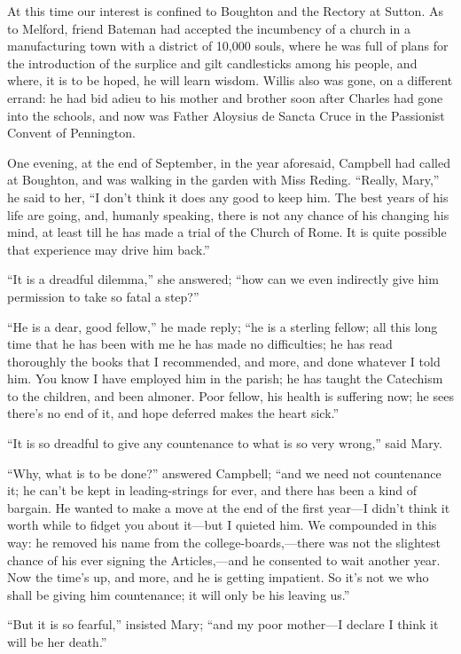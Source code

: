 At this time our interest is confined to Boughton and the Rectory
at Sutton. As to Melford, friend Bateman had accepted the incumbency
of a church in a manufacturing town with a district of 10,000 souls,
where he was full of plans for the introduction of the surplice and
gilt candlesticks among his people, and where, it is to be hoped, he
will learn wisdom. Willis also was gone, on a different errand: he had
bid adieu to his mother and brother soon after Charles had gone into
the schools, and now was Father Aloysius de Sancta Cruce in the
Passionist Convent of Pennington.

One evening, at the end of September, in the year aforesaid,
Campbell had called at Boughton, and was walking in the garden with
Miss Reding. ``Really, Mary,'' he said to her, ``I don't
think it does any good to keep him. The best years of his life are
going, and, humanly speaking, there is not any chance of his changing
his mind, at least till he has made a trial of the Church of Rome. It
is quite possible that experience may drive him back.''

``It is a dreadful dilemma,'' she answered; ``how can
we even indirectly give him permission to take so fatal a step?''

``He is a dear, good fellow,'' he made reply; ``he is a
sterling fellow; all this long time that he has been with me he has
made no difficulties; he has read thoroughly the books that I
recommended, and more, and done whatever I told him. You know I have
employed him in the parish; he has taught the Catechism to the
children, and been almoner. Poor fellow, his health is suffering now;
he sees there's no end of it, and hope deferred makes the heart
sick.''

``It is so dreadful to give any countenance to what is so very
wrong,'' said Mary.

``Why, what is to be done?'' answered Campbell; ``and
we need not countenance it; he can't be kept in leading-strings for
ever, and there has been a kind of bargain. He wanted to make a move
at the end of the first year—I didn't think it worth while to fidget
you about it—but I quieted him. We compounded in this way: he
removed his name from the college-boards,—there was not the
slightest chance of his ever signing the Articles,—and he consented
to wait another year. Now the time's up, and more, and he is
getting impatient. So it's not we who shall be giving him countenance;
it will only be his leaving us.''

``But it is so fearful,'' insisted Mary; ``and my poor
mother—I declare I think it will be her death.''


